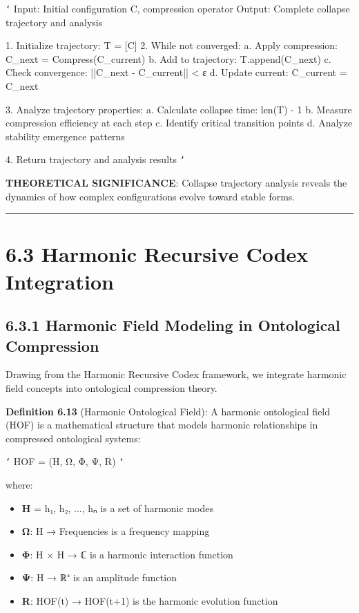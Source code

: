 \texttt{`}
Input: Initial configuration C, compression operator
Output: Complete collapse trajectory and analysis

1. Initialize trajectory: T = [C]
2. While not converged:
   a. Apply compression: C_next = Compress(C_current)
   b. Add to trajectory: T.append(C_next)
   c. Check convergence: ||C_next - C_current|| < ε
   d. Update current: C_current = C_next
   
3. Analyze trajectory properties:
   a. Calculate collapse time: len(T) - 1
   b. Measure compression efficiency at each step
   c. Identify critical transition points
   d. Analyze stability emergence patterns
   
4. Return trajectory and analysis results
\texttt{`}

\textbf{THEORETICAL SIGNIFICANCE}: Collapse trajectory analysis reveals the dynamics of how complex configurations evolve toward stable forms.

\hrule

\section{6.3 Harmonic Recursive Codex Integration}

\subsection{6.3.1 Harmonic Field Modeling in Ontological Compression}

Drawing from the Harmonic Recursive Codex framework, we integrate harmonic field concepts into ontological compression theory.

\textbf{Definition 6.13} (Harmonic Ontological Field): A harmonic ontological field (HOF) is a mathematical structure that models harmonic relationships in compressed ontological systems:

\texttt{`}
HOF = (H, Ω, Φ, Ψ, R)
\texttt{`}

where:
\begin{itemize}
\item \textbf{H} = {h₁, h₂, ..., hₙ} is a set of harmonic modes
\item \textbf{Ω}: H → Frequencies is a frequency mapping
\item \textbf{Φ}: H × H → ℂ is a harmonic interaction function
\item \textbf{Ψ}: H → ℝ⁺ is an amplitude function
\item \textbf{R}: HOF(t) → HOF(t+1) is the harmonic evolution function
\end{itemize}


